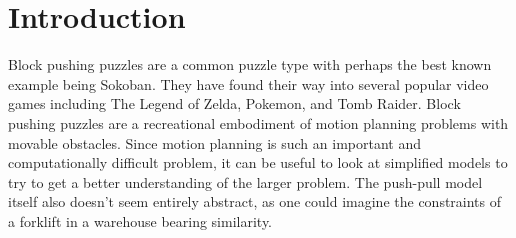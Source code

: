 
\section{Introduction} 
Block pushing puzzles are a common puzzle type with perhaps the best known example being Sokoban. They have found their way into several popular video games including The Legend of Zelda, Pokemon, and Tomb Raider. Block pushing puzzles are a recreational embodiment of motion planning problems with movable obstacles. Since motion planning is such an important and computationally difficult problem, it can be useful to look at simplified models to try to get a better understanding of the larger problem. The push-pull model itself also doesn't seem entirely abstract, as one could imagine the constraints of a forklift in a warehouse bearing similarity.

%

